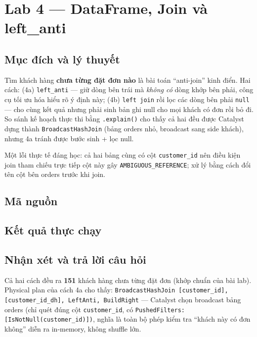 \documentclass[12pt,a4paper,oneside]{article}
\begin{document}
\section{Lab 4 --- DataFrame, Join và left\_anti}
\label{sec:lab4}

\subsection{Mục đích và lý thuyết}

Tìm khách hàng \textbf{chưa từng đặt đơn nào} là bài toán ``anti-join'' kinh điển. Hai cách: (4a) \texttt{left\_anti} --- giữ dòng bên trái mà \emph{không có} dòng khớp bên phải, công cụ tối ưu hóa hiểu rõ ý định này; (4b) \texttt{left join} rồi lọc các dòng bên phải \texttt{null} --- cho cùng kết quả nhưng phải sinh bản ghi null cho mọi khách có đơn rồi bỏ đi. So sánh kế hoạch thực thi bằng \texttt{.explain()} cho thấy cả hai đều được Catalyst dựng thành \texttt{BroadcastHashJoin} (bảng orders nhỏ, broadcast sang side khách), nhưng 4a tránh được bước sinh + lọc null.

Một lỗi thực tế đáng học: cả hai bảng cùng có cột \texttt{customer\_id} nên điều kiện join tham chiếu trực tiếp cột này gây \texttt{AMBIGUOUS\_REFERENCE}; xử lý bằng cách đổi tên cột bên orders trước khi join.

\subsection{Mã nguồn}



\subsection{Kết quả thực chạy}



\subsection{Nhận xét và trả lời câu hỏi}

Cả hai cách đều ra \textbf{151} khách hàng chưa từng đặt đơn (khớp chuẩn của bài lab). Physical plan của cách 4a cho thấy: \texttt{BroadcastHashJoin [customer\_id], [customer\_id\_dh], LeftAnti, BuildRight} --- Catalyst chọn broadcast bảng orders (chỉ quét đúng cột \texttt{customer\_id}, có \texttt{PushedFilters: [IsNotNull(customer\_id)])}, nghĩa là toàn bộ phép kiểm tra ``khách này có đơn không'' diễn ra in-memory, không shuffle lớn.
\end{document}
